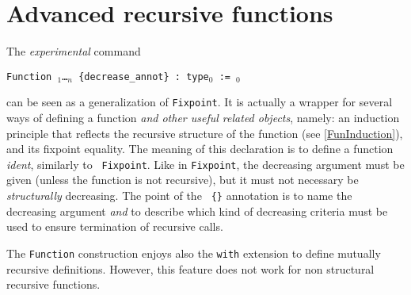 




\section{Advanced recursive functions}

The \emph{experimental} command 
\begin{center}
   \texttt{Function {\ident} {\binder$_1$}\ldots{\binder$_n$}
     \{decrease\_annot\} : type$_0$ := \term$_0$}
   \label{Function}
\end{center}
can be seen as a generalization of {\tt Fixpoint}.  It is actually a
wrapper for several ways of defining a function \emph{and other useful
  related objects}, namely: an induction principle that reflects the
recursive structure of the function (see \ref{FunInduction}), and its
fixpoint equality.  The meaning of this
declaration is to define a function {\it ident}, similarly to {\tt
  Fixpoint}. Like in {\tt Fixpoint}, the decreasing argument must be
given (unless the function is not recursive), but it must not
necessary be \emph{structurally} decreasing. The point of the {\tt
  \{\}} annotation is to name the decreasing argument \emph{and} to
describe which kind of decreasing criteria must be used to ensure
termination of recursive calls.

The {\tt Function} construction enjoys also the {\tt with} extension
to define mutually recursive definitions. However, this feature does
not work for non structural recursive functions. %

